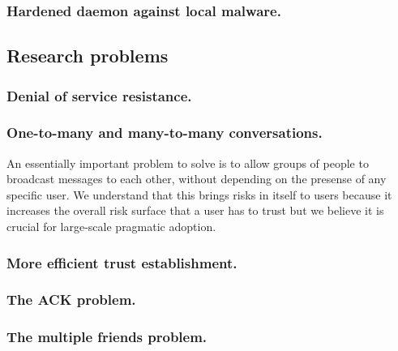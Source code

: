 \subsubsection{Hardened daemon against local malware.}

\subsection{Research problems}

\subsubsection{Denial of service resistance.}

\subsubsection{One-to-many and many-to-many conversations.} An essentially important problem to solve is to allow groups of people to broadcast messages to each other, without depending on the presense of any specific user. We understand that this brings risks in itself to users because it increases the overall risk surface that a user has to trust but we believe it is crucial for large-scale pragmatic adoption.

\subsubsection{More efficient trust establishment.}

\subsubsection{The ACK problem.}

\subsubsection{The multiple friends problem.}
